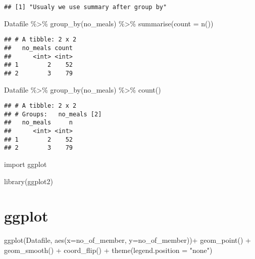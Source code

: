 \documentclass[
]{article}
\newenvironment{Shaded}{\begin{snugshade}}{\end{snugshade}}
\newcommand{\AttributeTok}[1]{\textcolor[rgb]{0.77,0.63,0.00}{#1}}
\newcommand{\FunctionTok}[1]{\textcolor[rgb]{0.00,0.00,0.00}{#1}}
\newcommand{\NormalTok}[1]{#1}
\newcommand{\SpecialCharTok}[1]{\textcolor[rgb]{0.00,0.00,0.00}{#1}}
\newcommand{\StringTok}[1]{\textcolor[rgb]{0.31,0.60,0.02}{#1}}
\begin{document}
\begin{verbatim}
## [1] "Usualy we use summary after group by"
\end{verbatim}

\begin{Shaded}
\begin{Highlighting}[]
\NormalTok{Datafile }\SpecialCharTok{\%\textgreater{}\%}
  \FunctionTok{group\_by}\NormalTok{(no\_meals) }\SpecialCharTok{\%\textgreater{}\%} 
    \FunctionTok{summarise}\NormalTok{(}\AttributeTok{count =} \FunctionTok{n}\NormalTok{())}
\end{Highlighting}
\end{Shaded}

\begin{verbatim}
## # A tibble: 2 x 2
##   no_meals count
##      <int> <int>
## 1        2    52
## 2        3    79
\end{verbatim}

\begin{Shaded}
\begin{Highlighting}[]
\NormalTok{Datafile }\SpecialCharTok{\%\textgreater{}\%}
  \FunctionTok{group\_by}\NormalTok{(no\_meals) }\SpecialCharTok{\%\textgreater{}\%} 
    \FunctionTok{count}\NormalTok{()}
\end{Highlighting}
\end{Shaded}

\begin{verbatim}
## # A tibble: 2 x 2
## # Groups:   no_meals [2]
##   no_meals     n
##      <int> <int>
## 1        2    52
## 2        3    79
\end{verbatim}

import ggplot

\begin{Shaded}
\begin{Highlighting}[]
\FunctionTok{library}\NormalTok{(ggplot2)}
\end{Highlighting}
\end{Shaded}

\hypertarget{ggplot}{%
\section{ggplot}\label{ggplot}}

\begin{Shaded}
\begin{Highlighting}[]
\FunctionTok{ggplot}\NormalTok{(Datafile, }\FunctionTok{aes}\NormalTok{(}\AttributeTok{x=}\NormalTok{no\_of\_member, }\AttributeTok{y=}\NormalTok{no\_of\_member))}\SpecialCharTok{+}
  \FunctionTok{geom\_point}\NormalTok{() }\SpecialCharTok{+}
  \FunctionTok{geom\_smooth}\NormalTok{() }\SpecialCharTok{+}
  \FunctionTok{coord\_flip}\NormalTok{() }\SpecialCharTok{+}
  \FunctionTok{theme}\NormalTok{(}\AttributeTok{legend.position =} \StringTok{"none"}\NormalTok{)}
\end{Highlighting}
\end{Shaded}
\end{document}
